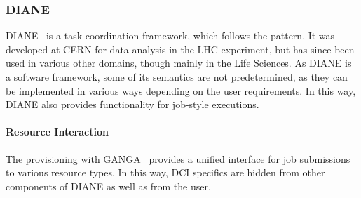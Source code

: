 \documentclass{sig-alternate}
\begin{document}

%
%
\subsubsection{DIANE}
\label{sec:diane}

DIANE~\cite{Moscicki:908910} is a task coordination framework, which follows
the \MW pattern. It was developed at CERN for data analysis in the
LHC experiment, but has since been used in various other domains, though mainly
in the Life Sciences. As DIANE is a software framework, some of its semantics
are not predetermined, as they can be implemented in various ways depending on
the user requirements. In this way, DIANE also provides \pilot functionality
for job-style executions.

\paragraph{Resource Interaction}
The \pilot provisioning with GANGA~\cite{Moscicki20092303} provides a unified
interface for job submissions to various resource types. In this way, DCI specifics are hidden
from other components of DIANE as well as from the user.
\end{document}
